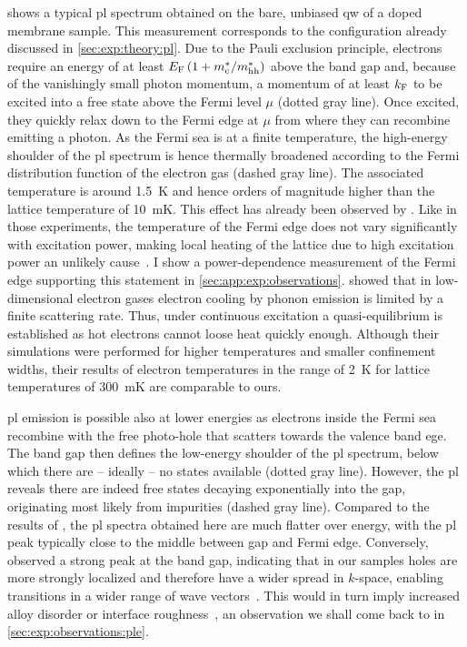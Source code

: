  shows a typical \gls{pl} spectrum obtained on the bare, unbiased \gls{qw} of a doped membrane sample.
This measurement corresponds to the configuration already discussed in \cref{sec:exp:theory:pl}.
Due to the Pauli exclusion principle, electrons require an energy of at least $E_{\mathrm{F}}\left(1 + m_{\mathrm{c}}^\ast/m_{\mathrm{hh}}^\ast\right)$ above the band gap and, because of the vanishingly small photon momentum, a momentum of at least $k_{\mathrm{F}}$ to be excited into a free state above the Fermi level $\mu$ (dotted gray line).
Once excited, they quickly relax down to the Fermi edge at $\mu$ from where they can recombine emitting a photon.
As the Fermi sea is at a finite temperature, the high-energy shoulder of the \gls{pl} spectrum is hence thermally broadened according to the Fermi distribution function of the electron gas (dashed gray line).
The associated temperature is around \qty{1.5}{\kelvin} and hence orders of magnitude higher than the lattice temperature of \qty{10}{\milli\kelvin}.
This effect has already been observed by \textcite{Pinczuk1984}.
Like in those experiments, the temperature of the Fermi edge does not vary significantly with excitation power, making local heating of the lattice due to high excitation power an unlikely cause~\cite{Ulbrich1973}.
I show a power-dependence measurement of the Fermi edge supporting this statement in \cref{sec:app:exp:observations}.
\textcite{Bockelmann1990} showed that in low-dimensional electron gases electron cooling by phonon emission is limited by a finite scattering rate.
Thus, under continuous excitation a quasi-equilibrium is established as hot electrons cannot loose heat quickly enough.
Although their simulations were performed for higher temperatures and smaller confinement widths, their results of electron temperatures in the range of \qty{2}{\kelvin} for lattice temperatures of \qty{300}{\milli\kelvin} are comparable to ours.

\Gls{pl} emission is possible also at lower energies as electrons inside the Fermi sea recombine with the free photo-hole that scatters towards the valence band ege.
The band gap then defines the low-energy shoulder of the \gls{pl} spectrum, below which there are -- ideally -- no states available (dotted gray line).
However, the \gls{pl} reveals there are indeed free states decaying exponentially into the gap, originating most likely from impurities (dashed gray line).
Compared to the results of \textcite{Kamburov2017}, the \gls{pl} spectra obtained here are much flatter over energy, with the \gls{pl} peak typically close to the middle between gap and Fermi edge.
Conversely, \textcite{Kamburov2017} observed a strong peak at the band gap,
indicating that in our samples holes are more strongly localized and therefore have a wider spread in $k$-space, enabling transitions in a wider range of wave vectors~\cite{Skolnick1987}.
This would in turn imply increased alloy disorder or interface roughness~\cite{Gabbay2008}, an observation we shall come back to in \cref{sec:exp:observations:ple}.

